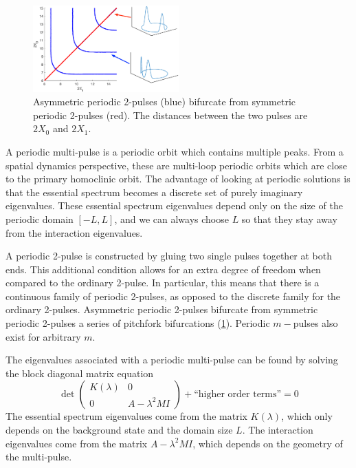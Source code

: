 \documentclass[12pt,reqno,oneside]{article}
\theoremstyle{definition}
\theoremstyle{remark}
\begin{document}
\begin{figure}
\includegraphics[width=0.5\textwidth]{images/periodicpitchforklabeled.eps}
\caption{Asymmetric periodic 2-pulses (blue) bifurcate from symmetric periodic 2-pulses (red). The distances between the two pulses are $2X_0$ and $2X_1$.
}
\label{fig:perpitchfork}
\end{figure}
A periodic multi-pulse is a periodic orbit which contains multiple peaks.  From a spatial dynamics perspective, these are multi-loop periodic orbits which are close to the primary homoclinic orbit. The advantage of looking at periodic solutions is that the essential spectrum becomes a discrete set of purely imaginary eigenvalues. These essential spectrum eigenvalues depend only on the size of the periodic domain $[-L, L]$, and we can always choose $L$ so that they stay away from the interaction eigenvalues. 

A periodic 2-pulse is constructed by gluing two single pulses together at both ends. This additional condition allows for an extra degree of freedom when compared to the ordinary 2-pulse. In particular, this means that there is a continuous family of periodic 2-pulses, as opposed to the discrete family for the ordinary 2-pulses. Asymmetric periodic 2-pulses bifurcate from symmetric periodic 2-pulses a series of pitchfork bifurcations (\cref{fig:perpitchfork}). Periodic $m-$pulses also exist for arbitrary $m$.

The eigenvalues associated with a periodic multi-pulse can be found by solving the block diagonal matrix equation
\begin{equation}\label{blockmatrix}
\det\begin{pmatrix}K(\lambda) & 0 \\ 0 & A - \lambda^2 M I \end{pmatrix} + \text{``higher order terms''} = 0
\end{equation}
The essential spectrum eigenvalues come from the matrix $K(\lambda)$, which only depends on the background state and the domain size $L$. The interaction eigenvalues come from the matrix $A - \lambda^2 M I$, which depends on the geometry of the multi-pulse. 
\end{document}
